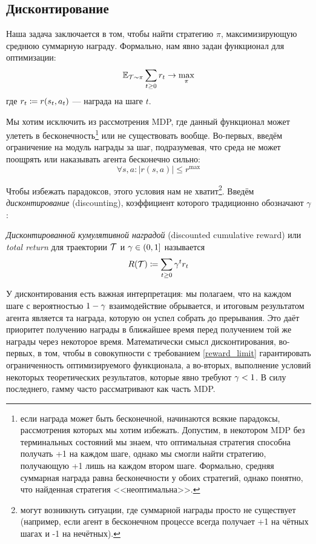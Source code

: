 \subsection{Дисконтирование}

Наша задача заключается в том, чтобы найти стратегию $\pi$, максимизирующую среднюю суммарную награду. Формально, нам явно задан функционал для оптимизации:
\begin{equation}\label{sumreward}
\mathbb{E}_{\mathcal{T} \sim \pi} \sum_{t \ge 0} r_t \to \max_{\pi}
\end{equation}
где $r_t \HM\coloneqq r(s_t, a_t)$ --- награда на шаге $t$.

Мы хотим исключить из рассмотрения MDP, где данный функционал может улететь в бесконечность\footnote{если награда может быть бесконечной, начинаются всякие парадоксы, рассмотрения которых мы хотим избежать. Допустим, в некотором MDP без терминальных состояний мы знаем, что оптимальная стратегия способна получать +1 на каждом шаге, однако мы смогли найти стратегию, получающую +1 лишь на каждом втором шаге. Формально, средняя суммарная награда равна бесконечности у обоих стратегий, однако понятно, что найденная стратегия <<неоптимальна>>.} или не существовать вообще. Во-первых, введём ограничение на модуль награды за шаг, подразумевая, что среда не может поощрять или наказывать агента бесконечно сильно:
\begin{equation}\label{reward_limit}
\forall s, a \colon |r(s, a)| \le r^{\max}
\end{equation}

Чтобы избежать парадоксов, этого условия нам не хватит\footnote{могут возникнуть ситуации, где суммарной награды просто не существует (например, если агент в бесконечном процессе всегда получает +1 на чётных шагах и -1 на нечётных).}. Введём \emph{дисконтирование} (discounting), коэффициент которого традиционно обозначают $\gamma$:
 
\begin{definition}
\emph{Дисконтированной кумулятивной наградой} (discounted cumulative reward) или \emph{total return} для траектории $\mathcal{T}$ и $\gamma \HM\in (0, 1]$ называется
\begin{equation}\label{return}
R(\mathcal{T}) \coloneqq \sum_{t \ge 0} \gamma^t r_t
\end{equation}
\end{definition}

У дисконтирования есть важная интерпретация: мы полагаем, что на каждом шаге с вероятностью $1 \HM- \gamma$ взаимодействие обрывается, и итоговым результатом агента является та награда, которую он успел собрать до прерывания. Это даёт приоритет получению награды в ближайшее время перед получением той же награды через некоторое время. Математически смысл дисконтирования, во-первых, в том, чтобы в совокупности с требованием \eqref{reward_limit} гарантировать ограниченность оптимизируемого функционала, а во-вторых, выполнение условий некоторых теоретических результатов, которые явно требуют $\gamma \HM< 1$. В силу последнего, гамму часто рассматривают как часть MDP.

